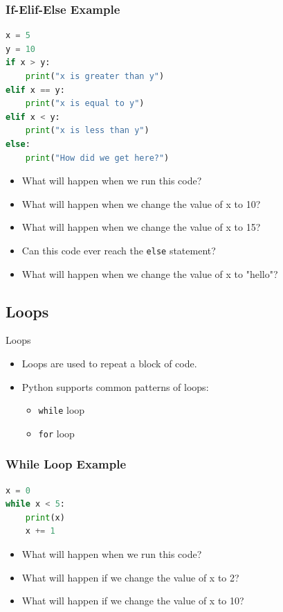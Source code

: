 \documentclass[aspectratio=169]{beamer}
\begin{document}
\begin{frame}[fragile]
    \frametitle{If-Elif-Else Example}
    \begin{lstlisting}[language=Python, caption={If-Elif-Else Statement}]
x = 5
y = 10
if x > y:
    print("x is greater than y")
elif x == y:
    print("x is equal to y")
elif x < y:
    print("x is less than y")
else:
    print("How did we get here?")
\end{lstlisting}

    \begin{itemize}
        \item What will happen when we run this code?
        \item What will happen when we change the value of x to 10?
        \item What will happen when we change the value of x to 15?
        \item Can this code ever reach the \texttt{else} statement?
        \item What will happen when we change the value of x to "hello"?
    \end{itemize}
\end{frame}

\subsection{Loops}

\begin{frame}{Loops}
    \begin{itemize}
        \item Loops are used to repeat a block of code.
        \item Python supports common patterns of loops:
              \begin{itemize}
                  \item \texttt{while} loop
                  \item \texttt{for} loop
              \end{itemize}
    \end{itemize}
\end{frame}

\begin{frame}[fragile]
    \frametitle{While Loop Example}
    \begin{lstlisting}[language=Python, caption={Simple While Loop}]
x = 0
while x < 5:
    print(x)
    x += 1
\end{lstlisting}

    \begin{itemize}
        \item What will happen when we run this code?
        \item What will happen if we change the value of x to 2?
        \item What will happen if we change the value of x to 10?
    \end{itemize}
\end{frame}
\end{document}

